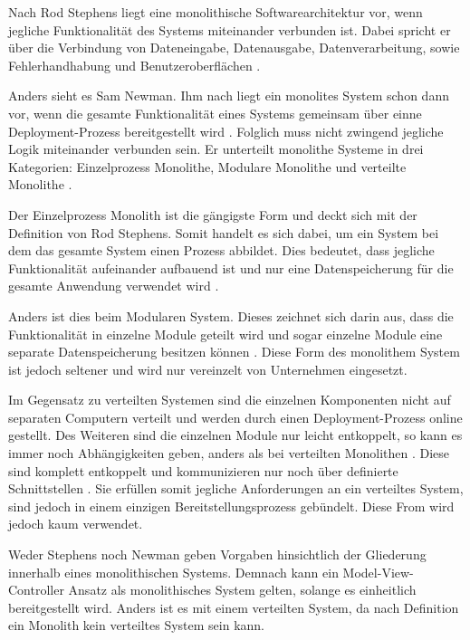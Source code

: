 Nach Rod Stephens liegt eine monolithische Softwarearchitektur vor, wenn jegliche Funktionalität des Systems miteinander verbunden ist. Dabei spricht er über die Verbindung von Dateneingabe, Datenausgabe, Datenverarbeitung, sowie Fehlerhandhabung und Benutzeroberflächen \parencite[vgl.][S. 94]{stephens_beginning_2015}.

Anders sieht es Sam Newman. Ihm nach liegt ein monolites System schon dann vor, wenn die gesamte Funktionalität eines Systems gemeinsam über einne Deployment-Prozess bereitgestellt wird \parencite[vgl.][Kap. 2.2]{newman_monolith_2019}. Folglich muss nicht zwingend jegliche Logik miteinander verbunden sein. Er unterteilt monolithe Systeme in drei Kategorien: Einzelprozess Monolithe, Modulare Monolithe und verteilte Monolithe \parencite[vgl.][Kap. 2.2]{newman_monolith_2019}.

Der Einzelprozess Monolith ist die gängigste Form und deckt sich mit der Definition von Rod Stephens. Somit handelt es sich dabei, um ein System bei dem das gesamte System einen Prozess abbildet. Dies bedeutet, dass jegliche Funktionalität aufeinander aufbauend ist und nur eine Datenspeicherung für die gesamte Anwendung verwendet wird \parencite[vgl.][Kap. 2.2.1]{newman_monolith_2019}.

Anders ist dies beim Modularen System. Dieses zeichnet sich darin aus, dass die Funktionalität in einzelne Module geteilt wird und sogar einzelne Module eine separate Datenspeicherung besitzen können \parencite[vgl.][Kap. 2.2.2]{newman_monolith_2019}. Diese Form des monolithem System ist jedoch seltener und wird nur vereinzelt von Unternehmen eingesetzt.

Im Gegensatz zu verteilten Systemen sind die einzelnen Komponenten nicht auf separaten Computern verteilt und werden durch einen Deployment-Prozess online gestellt. Des Weiteren sind die einzelnen Module nur leicht entkoppelt, so kann es immer noch Abhängigkeiten geben, anders als bei verteilten Monolithen \parencite[vgl.][Kap. 2.2.2]{newman_monolith_2019}. Diese sind komplett entkoppelt und kommunizieren nur noch über definierte Schnittstellen \parencite[vlg.][S. 116]{starke_effektive_2015}. Sie erfüllen somit jegliche Anforderungen an ein verteiltes System, sind jedoch in einem einzigen Bereitstellungsprozess gebündelt. Diese From wird jedoch kaum verwendet.

Weder Stephens noch Newman geben Vorgaben hinsichtlich der Gliederung innerhalb eines monolithischen Systems. Demnach kann ein Model-View-Controller Ansatz als monolithisches System gelten, solange es einheitlich bereitgestellt wird. Anders ist es mit einem verteilten System, da nach Definition ein Monolith kein verteiltes System sein kann. 

